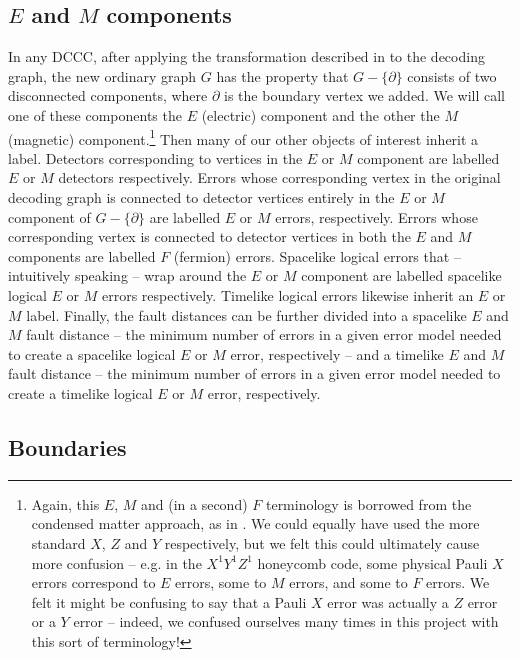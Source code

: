 \subsection{\texorpdfstring{$E$ and $M$ components}{E and M components}}\label{subsec:E_and_M_components}

In any DCCC, after applying the transformation described in  to the decoding graph,
the new ordinary graph $G$ has the property that $G - \{\partial\}$ consists of two disconnected components,
where $\partial$ is the boundary vertex we added.
We will call one of these components the $E$ (electric) component and the other the $M$ (magnetic) component.\footnote{%
    Again, this $E$, $M$ and (in a second) $F$ terminology is borrowed from the condensed matter approach, as in .
    We could equally have used the more standard $X$, $Z$ and $Y$ respectively, but we felt this could ultimately cause more confusion -- e.g. in the $X^1 Y^1 Z^1$ honeycomb code, some physical Pauli $X$ errors correspond to $E$ errors, some to $M$ errors, and some to $F$ errors.
    We felt it might be confusing to say that a Pauli $X$ error was actually a $Z$ error or a $Y$ error -- indeed, we confused ourselves many times in this project with this sort of terminology!}
Then many of our other objects of interest inherit a label.
Detectors corresponding to vertices in the $E$ or $M$ component are labelled $E$ or $M$ detectors respectively.
Errors whose corresponding vertex in the original decoding graph is connected to detector vertices entirely in the $E$ or $M$ component of $G - \{\partial\}$ are labelled $E$ or $M$ errors, respectively.
Errors whose corresponding vertex is connected to detector vertices in both the $E$ and $M$ components are labelled $F$ (fermion) errors.
Spacelike logical errors that -- intuitively speaking -- wrap around the $E$ or $M$ component are labelled spacelike logical $E$ or $M$ errors respectively.
Timelike logical errors likewise inherit an $E$ or $M$ label.
Finally, the fault distances can be further divided into a spacelike $E$ and $M$ fault distance -- the minimum number of errors in a given error model needed to create a spacelike logical $E$ or $M$ error, respectively -- and a timelike $E$ and $M$ fault distance -- the minimum number of errors in a given error model needed to create a timelike logical $E$ or $M$ error, respectively.

\subsection{Boundaries}\label{subsec:boundaries}

